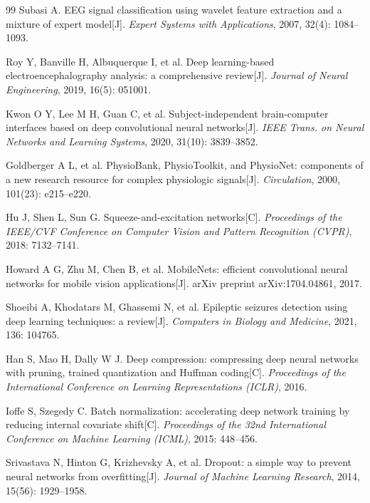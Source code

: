 \documentclass[12pt, a4paper]{article}
\begin{document}
\begin{thebibliography}{99}
Subasi A. EEG signal classification using wavelet feature extraction and a mixture of expert model[J]. \emph{Expert Systems with Applications}, 2007, 32(4): 1084--1093.

Roy Y, Banville H, Albuquerque I, et al. Deep learning-based electroencephalography analysis: a comprehensive review[J]. \emph{Journal of Neural Engineering}, 2019, 16(5): 051001.

Kwon O Y, Lee M H, Guan C, et al. Subject-independent brain-computer interfaces based on deep convolutional neural networks[J]. \emph{IEEE Trans. on Neural Networks and Learning Systems}, 2020, 31(10): 3839--3852.

Goldberger A L, et al. PhysioBank, PhysioToolkit, and PhysioNet: components of a new research resource for complex physiologic signals[J]. \emph{Circulation}, 2000, 101(23): e215--e220.


Hu J, Shen L, Sun G. Squeeze-and-excitation networks[C]. \emph{Proceedings of the IEEE/CVF Conference on Computer Vision and Pattern Recognition (CVPR)}, 2018: 7132--7141.

Howard A G, Zhu M, Chen B, et al. MobileNets: efficient convolutional neural networks for mobile vision applications[J]. arXiv preprint arXiv:1704.04861, 2017.

Shoeibi A, Khodatars M, Ghassemi N, et al. Epileptic seizures detection using deep learning techniques: a review[J]. \emph{Computers in Biology and Medicine}, 2021, 136: 104765.

Han S, Mao H, Dally W J. Deep compression: compressing deep neural networks with pruning, trained quantization and Huffman coding[C]. \emph{Proceedings of the International Conference on Learning Representations (ICLR)}, 2016.

Ioffe S, Szegedy C. Batch normalization: accelerating deep network training by reducing internal covariate shift[C]. \emph{Proceedings of the 32nd International Conference on Machine Learning (ICML)}, 2015: 448--456.

Srivastava N, Hinton G, Krizhevsky A, et al. Dropout: a simple way to prevent neural networks from overfitting[J]. \emph{Journal of Machine Learning Research}, 2014, 15(56): 1929--1958.


\end{thebibliography}
\end{document}
